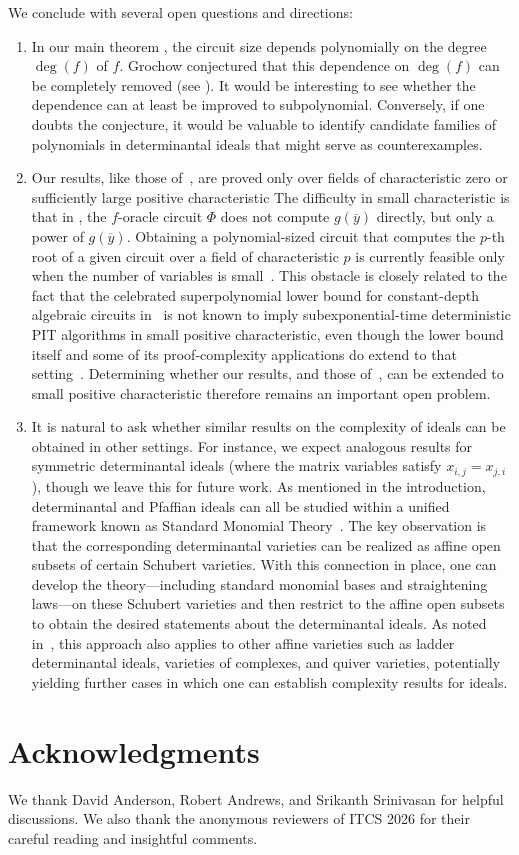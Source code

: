 \documentclass[letterpaper, 11pt]{amsart}
\begin{document}
We conclude with several open questions and directions:

\begin{enumerate}
\item In our main theorem , the circuit size depends polynomially on the degree $\deg(f)$ of $f$.
Grochow conjectured that this dependence on $\deg(f)$ can be completely removed (see ).
It would be interesting to see whether the dependence can at least be improved to subpolynomial.
Conversely, if one doubts the conjecture, it would be valuable to identify candidate families of polynomials in determinantal ideals that might serve as counterexamples.

\item Our results, like those of~\cite{AF21}, are proved only over fields of characteristic zero or sufficiently large positive characteristic 
The difficulty in small characteristic is that in , the $f$-oracle circuit $\Phi$ does not compute $g(\overline{y})$ directly, but only a power of $g(\overline{y})$.
Obtaining a polynomial-sized circuit that computes the $p$-th root of a given circuit over a field of characteristic $p$ is currently feasible only when the number of variables is small~\cite{And20}.
This obstacle is closely related to the fact that the celebrated superpolynomial lower bound for constant-depth algebraic circuits in~\cite{LST25} is not known to imply subexponential-time deterministic PIT algorithms in small positive characteristic, even though the lower bound itself and some of its proof-complexity applications do extend to that setting~\cite{For24,BLRS25}.
Determining whether our results, and those of~\cite{AF21}, can be extended to small positive characteristic therefore remains an important open problem.

\item It is natural to ask whether similar results on the complexity of ideals can be obtained in other settings.
For instance, we expect analogous results for symmetric determinantal ideals (where the matrix variables satisfy $x_{i,j} = x_{j,i}$), though we leave this for future work.
As mentioned in the introduction, determinantal and Pfaffian ideals can all be studied within a unified framework known as Standard Monomial Theory~\cite{LR08,Ses16}.
The key observation is that the corresponding determinantal varieties can be realized as affine open subsets of certain Schubert varieties.
With this connection in place, one can develop the theory---including standard monomial bases and straightening laws---on these Schubert varieties and then restrict to the affine open subsets to obtain the desired statements about the determinantal ideals.
As noted in~\cite{Mus03}, this approach also applies to other affine varieties such as ladder determinantal ideals, varieties of complexes, and quiver varieties, potentially yielding further cases in which one can establish complexity results for ideals.
\end{enumerate}

\section*{Acknowledgments}

We thank David Anderson, Robert Andrews, and Srikanth Srinivasan for helpful discussions. 
We also thank the anonymous reviewers of ITCS 2026 for their careful reading and insightful comments.

\printbibliography
\end{document}
